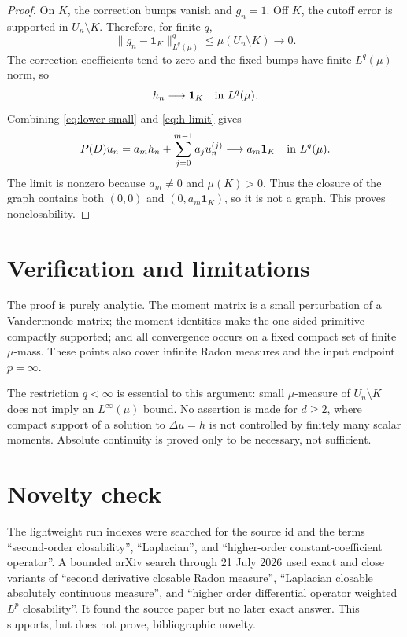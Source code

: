\documentclass[11pt]{article}
\begin{document}
\begin{proof}
On $K$, the correction bumps vanish and $g_n=1$.  Off $K$, the cutoff error
is supported in $U_n\setminus K$.  Therefore, for finite $q$,
\[
 \|g_n-\mathbf1_K\|_{L^q(\mu)}^q
 \le \mu(U_n\setminus K)\longrightarrow0.
\]
The correction coefficients tend to zero and the fixed bumps have finite
$L^q(\mu)$ norm, so
\begin{equation}\label{eq:h-limit}
 h_n\longrightarrow\mathbf1_K
 \quad\hbox{in }L^q(\mu).
\end{equation}
Combining \eqref{eq:lower-small} and \eqref{eq:h-limit} gives
\[
 P(D)u_n
 =a_mh_n+\sum_{j=0}^{m-1}a_ju_n^{(j)}
 \longrightarrow a_m\mathbf1_K
 \quad\hbox{in }L^q(\mu).
\]
The limit is nonzero because $a_m\ne0$ and $\mu(K)>0$.  Thus the closure of
the graph contains both $(0,0)$ and $(0,a_m\mathbf1_K)$, so it is not a graph.
This proves nonclosability.
\end{proof}

\section{Verification and limitations}

The proof is purely analytic.  The moment matrix is a small perturbation of a
Vandermonde matrix; the moment identities make the one-sided primitive compactly
supported; and all convergence occurs on a fixed compact set of finite
$\mu$-mass.  These points also cover infinite Radon measures and the input
endpoint $p=\infty$.

The restriction $q<\infty$ is essential to this argument: small
$\mu$-measure of $U_n\setminus K$ does not imply an $L^\infty(\mu)$ bound.
No assertion is made for $d\ge2$, where compact support of a solution to
$\Delta u=h$ is not controlled by finitely many scalar moments.  Absolute
continuity is proved only to be necessary, not sufficient.

\section{Novelty check}

The lightweight run indexes were searched for the source id and the terms
``second-order closability'', ``Laplacian'', and ``higher-order
constant-coefficient operator''.  A bounded arXiv search through 21 July 2026
used exact and close variants of ``second derivative closable Radon measure'',
``Laplacian closable absolutely continuous measure'', and ``higher order
differential operator weighted $L^p$ closability''.  It found the source paper
but no later exact answer.  This supports, but does not prove, bibliographic
novelty.
\end{document}
